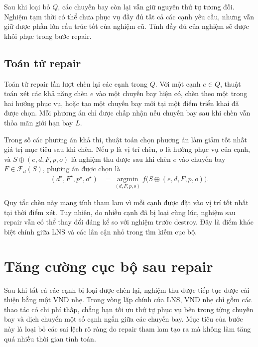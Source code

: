 Sau khi loại bỏ $Q$, các chuyến bay còn lại vẫn giữ nguyên thứ tự tương đối. Nghiệm tạm thời có thể chưa phục vụ đầy đủ tất cả các cạnh yêu cầu, nhưng vẫn giữ được phần lớn cấu trúc tốt của nghiệm cũ. Tính đầy đủ của nghiệm sẽ được khôi phục trong bước repair.

\subsection{Toán tử repair}
\label{subsec:lns-repair}

Toán tử repair lần lượt chèn lại các cạnh trong $Q$. Với một cạnh $e \in Q$, thuật toán xét các khả năng chèn $e$ vào một chuyến bay hiện có, chèn theo một trong hai hướng phục vụ, hoặc tạo một chuyến bay mới tại một điểm triển khai đã được chọn. Mỗi phương án chỉ được chấp nhận nếu chuyến bay sau khi chèn vẫn thỏa mãn giới hạn bay $L$.

Trong số các phương án khả thi, thuật toán chọn phương án làm giảm tốt nhất giá trị mục tiêu sau khi chèn. Nếu $p$ là vị trí chèn, $o$ là hướng phục vụ của cạnh, và $S \oplus (e,d,F,p,o)$ là nghiệm thu được sau khi chèn $e$ vào chuyến bay $F \in \mathcal{F}_d(S)$, phương án được chọn là
\begin{equation}
\begin{aligned}
(d^\star,F^\star,p^\star,o^\star)
&=
\operatorname*{argmin}_{(d,F,p,o)}
f\bigl(S \oplus (e,d,F,p,o)\bigr).
\end{aligned}
\label{eq:lns-best-insertion}
\end{equation}

Quy tắc chèn này mang tính tham lam vì mỗi cạnh được đặt vào vị trí tốt nhất tại thời điểm xét. Tuy nhiên, do nhiều cạnh đã bị loại cùng lúc, nghiệm sau repair vẫn có thể thay đổi đáng kể so với nghiệm trước destroy. Đây là điểm khác biệt chính giữa LNS và các lân cận nhỏ trong tìm kiếm cục bộ.

\section{Tăng cường cục bộ sau repair}
\label{sec:lns-local-improvement}

Sau khi tất cả các cạnh bị loại được chèn lại, nghiệm thu được tiếp tục được cải thiện bằng một VND nhẹ. Trong vòng lặp chính của LNS, VND nhẹ chỉ gồm các thao tác có chi phí thấp, chẳng hạn tối ưu thứ tự phục vụ bên trong từng chuyến bay và dịch chuyển một số cạnh ngắn giữa các chuyến bay. Mục tiêu của bước này là loại bỏ các sai lệch rõ ràng do repair tham lam tạo ra mà không làm tăng quá nhiều thời gian tính toán.

